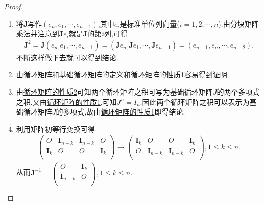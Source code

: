 \documentclass[../../main.tex]{subfiles}%
\begin{document}
\begin{proof}
\begin{enumerate}
\item 将$\boldsymbol{J}$写作$(e_n,e_1,\cdots,e_{n-1})$,其中$e_i$是标准单位列向量($i=1,2,\cdots,n$).由分块矩阵乘法并注意到$\boldsymbol{J}e_i$就是$\boldsymbol{J}$的第$i$列,可得
\begin{align*}
\boldsymbol{J}^2=\boldsymbol{J}\left( e_{n,}e_1,\cdots ,e_{n-1} \right) =\left( \boldsymbol{J}e_{n,}\boldsymbol{J}e_1,\cdots ,\boldsymbol{J}e_{n-1} \right) =\left( e_{n-1},e_n,\cdots ,e_{n-2} \right) .
\end{align*}
不断这样做下去就可以得到结论.
\item 由\hyperref[definition:循环矩阵]{循环矩阵和基础循环矩阵的定义}和\hyperref[proposition:循环矩阵的性质]{循环矩阵的性质1}容易得到证明.
\item 由\hyperref[proposition:循环矩阵的性质]{循环矩阵的性质2}可知两个循环矩阵之积可写为基础循环矩阵$J$的两个多项式之积.又由\hyperref[proposition:循环矩阵的性质]{循环矩阵的性质1},可知$J^n=I_n$.因此两个循环矩阵之积可以表示为基础循环矩阵$J$的多项式,故由\hyperref[proposition:循环矩阵的性质]{循环矩阵的性质1}即得结论.
\item 利用矩阵初等行变换可得
\begin{align*}
\left( \begin{matrix}
O&		\boldsymbol{I}_{n-k}&		\boldsymbol{I}_{n-k}&		O\\
\boldsymbol{I}_k&		O&		O&		\boldsymbol{I}_k\\
\end{matrix} \right) \rightarrow \left( \begin{matrix}
\boldsymbol{I}_k&		O&		O&		\boldsymbol{I}_k\\
O&		\boldsymbol{I}_{n-k}&		\boldsymbol{I}_{n-k}&		O\\
\end{matrix} \right) ,1\leqslant k\leqslant n.
\end{align*}
从而$\boldsymbol{J}^{-1}=\left( \begin{matrix}
O&		\boldsymbol{I}_k\\
\boldsymbol{I}_{n-k}&		O\\
\end{matrix} \right) ,1\leqslant k\leqslant n.$
\end{enumerate}

\end{proof}
\end{document}
